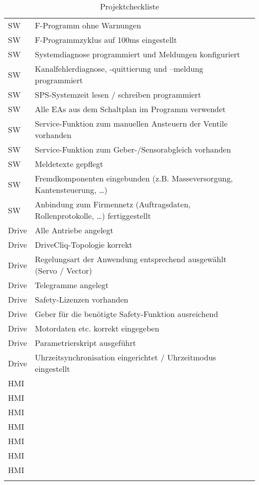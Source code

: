 \begin{longtable}{| p{} | p{} | p{} |}
         &  \\
        \hline
        SW & F-Programm ohne Warnungen &  \\
        \hline
        SW & F-Programmzyklus auf 100ms eingestellt &  \\
        \hline
        SW & Systemdiagnose programmiert und Meldungen konfiguriert &  \\
        \hline
        SW & Kanalfehlerdiagnose, -quittierung und –meldung programmiert &  \\
        \hline
        SW & SPS-Systemzeit lesen / schreiben programmiert &  \\
        \hline
        SW & Alle EAs aus dem Schaltplan im Programm verwendet &  \\
        \hline
        SW & Service-Funktion zum manuellen Ansteuern der Ventile vorhanden &  \\
        \hline
        SW & Service-Funktion zum Geber-/Sensorabgleich vorhanden &  \\
        \hline
        SW & Meldetexte gepflegt &  \\
        \hline
        SW & Fremdkomponenten eingebunden (z.B. Masseversorgung, Kantensteuerung, …) &  \\
        \hline
        SW & Anbindung zum Firmennetz (Auftragsdaten, Rollenprotokolle, …) fertiggestellt &  \\
        \hline
        Drive & Alle Antriebe angelegt &  \\
        \hline
        Drive & DriveCliq-Topologie korrekt &  \\
        \hline
        Drive & Regelungsart der Anwendung entsprechend ausgewählt (Servo / Vector) &  \\
        \hline
        Drive & Telegramme angelegt &  \\
        \hline
        Drive & Safety-Lizenzen vorhanden &  \\
        \hline
        Drive & Geber für die benötigte Safety-Funktion ausreichend &  \\
        \hline
        Drive & Motordaten etc. korrekt eingegeben &  \\
        \hline
        Drive & Parametrierskript ausgeführt &  \\
        \hline
        Drive & Uhrzeitsynchronisation eingerichtet / Uhrzeitmodus eingestellt &  \\
        \hline
        HMI &  &  \\
        \hline
        HMI &  &  \\
        \hline
        HMI &  &  \\
        \hline
        HMI &  &  \\
        \hline
        HMI &  &  \\
        \hline
        HMI &  &  \\
        \hline
        HMI &  &  \\
        \hline

        \caption{Projektcheckliste}\label{tab:Projektcheckliste} %
    \end{longtable}
